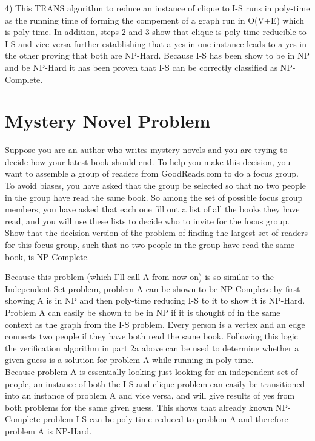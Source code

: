 \documentclass[11pt]{article}
\begin{document}
4) This TRANS algorithm to reduce an instance of clique to I-S runs in poly-time as the running time of forming the compement of a graph run in O(V+E) which is poly-time. In addition, steps 2 and 3 show that clique is poly-time reducible to I-S and vice versa further establishing that a yes in one instance leads to a yes in the other proving that both are NP-Hard. Because I-S has been show to be in NP and be NP-Hard it has been proven that I-S can be correctly classified as NP-Complete.\\

\bigskip
\bigskip

\section{Mystery Novel Problem}
Suppose you are an author who writes mystery novels and you are trying to decide how your
latest book should end. To help you make this decision, you want to assemble a group of readers from
GoodReads.com to do a focus group. To avoid biases, you have asked that the group be selected so that no
two people in the group have read the same book. So among the set of possible focus group members, you
have asked that each one fill out a list of all the books they have read, and you will use these lists to decide
who to invite for the focus group. \\

\noindent Show that the decision version of the problem of finding the largest set of readers for this focus group, such that no two people in the group have read the same book, is NP-Complete. \\

\bigskip
\bigskip

Because this problem (which I'll call A from now on) is so similar to the Independent-Set problem, problem A can be shown to be NP-Complete by first showing A is in NP and then poly-time reducing I-S to it to show it is NP-Hard. \\

Problem A can easily be shown to be in NP if it is thought of in the same context as the graph from the I-S problem. Every person is a vertex and an edge connects two people if they have both read the same book. Following this logic the verification algorithm in part 2a above can be used to determine whether a given guess is a solution for problem A while running in poly-time. \\

Because problem A is essentially looking just looking for an independent-set of people, an instance of both the I-S and clique problem can easily be transitioned into an instance of problem A and vice versa, and will give results of yes from both problems for the same given guess. This shows that already known NP-Complete problem I-S can be poly-time reduced to problem A and therefore problem A is NP-Hard. \\
\end{document}
